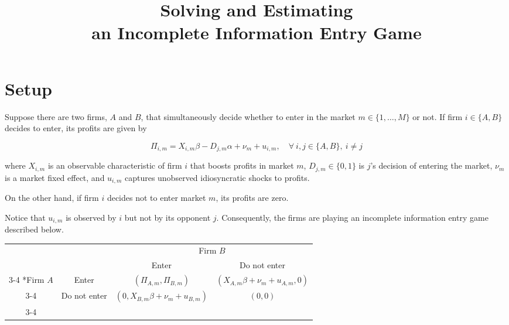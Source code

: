 \documentclass[cm,linguex]{glossa}
\title[Empirical Industrial Organization]{Solving and Estimating\\
an Incomplete Information Entry Game}
\author[Lezama]{
    \spauthor{Carlos Enrique Lezama Jacinto\\
  \institute{\hfill\break
Instituto Tecnológico\\
Autónomo de México}\\
  \small{\hfill\break
clezamaj@itam.mx}
  }%
  }
\begin{document}
\sffamily
\maketitle



\rmfamily

\hypertarget{setup}{%
\section{Setup}\label{setup}}

Suppose there are two firms, \(A\) and \(B\), that simultaneously decide
whether to enter in the market \(m \in \{1, \dots, M\}\) or not. If firm
\(i \in \{A, B\}\) decides to enter, its profits are given by

\[
\Pi_{i, m} = X_{i, m} \beta - D_{j, m} \alpha + \nu_m + u_{i, m}, \quad \forall\ i, j \in \{A, B\},\ i \neq j
\]

where \(X_{i, m}\) is an observable characteristic of firm \(i\) that
boosts profits in market \(m\), \(D_{j, m} \in \{0, 1\}\) is \(j\)'s
decision of entering the market, \(\nu_m\) is a market fixed effect, and
\(u_{i, m}\) captures unobserved idiosyncratic shocks to profits.

On the other hand, if firm \(i\) decides not to enter market \(m\), its
profits are zero.

Notice that \(u_{i, m}\) is observed by \(i\) but not by its opponent
\(j\). Consequently, the firms are playing an incomplete information
entry game described below.

\begin{center}
\begin{tabular}{cc|c|c|}
    & \multicolumn{1}{c}{} & \multicolumn{2}{c}{Firm $B$}\\
                            & \multicolumn{1}{c}{} & \multicolumn{1}{c}{Enter}                             & \multicolumn{1}{c}{Do not enter}                      \\\cline{3-4}
    \multirow{2}*{Firm $A$} & Enter                & $\left(\Pi_{A ,m}, \Pi_{B, m}\right)$                 & $\left( X_{A, m} \beta + \nu_m + u_{A, m}, 0 \right)$ \\\cline{3-4}
                            & Do not enter         & $\left( 0, X_{B, m} \beta + \nu_m + u_{B, m} \right)$ & $\left(0, 0\right)$                                   \\\cline{3-4}
\end{tabular}
\end{center}
\end{document}

